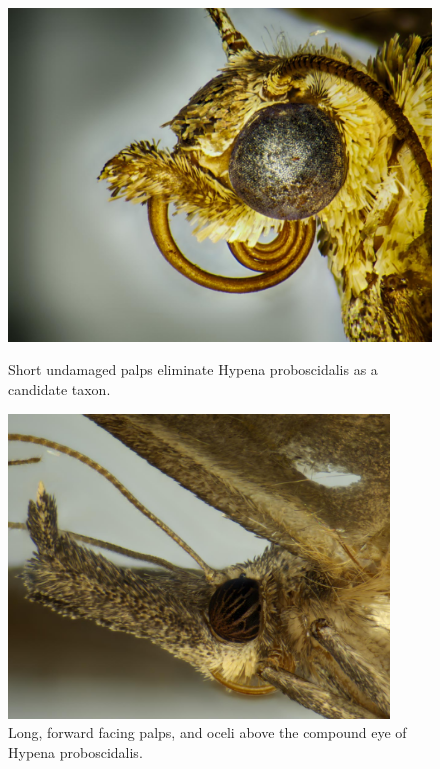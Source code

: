 \documentclass[]{article}
\begin{document}
\begin{figure}
	\centering
	\begin{minipage}{0.45\textwidth}
		\centering
	\includegraphics[width=0.5\linewidth]{images/20201112-1}
	\caption{Short undamaged palps eliminate Hypena proboscidalis as a candidate taxon.}
	\label{fig:20201112-1}
	\end{minipage}\hfill
	\begin{minipage}{0.45\textwidth}
		\centering
		\includegraphics[width=0.9\textwidth]{S202012271446-4} %
		\caption{Long, forward facing palps, and oceli above the compound eye of Hypena proboscidalis.}
		\label{fig:S202012271446-1}
	\end{minipage}
\end{figure}

%



\end{document}
